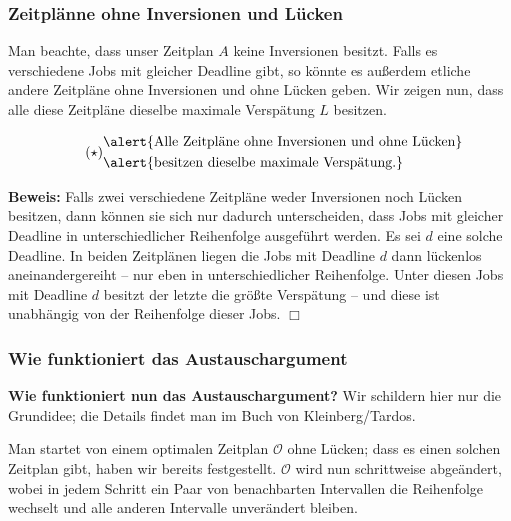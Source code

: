 \documentclass[smaller]{beamer}
\begin{document}
\begin{frame}
 \frametitle{Zeitplänne ohne Inversionen und Lücken}
 Man beachte, dass unser Zeitplan $A$ keine Inversionen besitzt. Falls es verschiedene Jobs mit gleicher Deadline gibt, so könnte es außerdem etliche andere Zeitpläne ohne Inversionen und ohne Lücken geben. Wir zeigen nun, dass alle diese Zeitpläne dieselbe maximale Verspätung $L$ besitzen.

\begin{align}
\label{eq:12:*}
\tag{$\star$}
\begin{split}
&\alert{\text{Alle Zeitpläne ohne Inversionen und ohne Lücken}} \\
&\alert{\text{besitzen dieselbe maximale Verspätung.}}
\end{split}
\end{align}

\textbf{Beweis:} Falls zwei verschiedene Zeitpläne weder Inversionen noch Lücken besitzen, dann können sie sich nur dadurch unterscheiden, dass Jobs mit gleicher Deadline in unterschiedlicher Reihenfolge ausgeführt werden. Es sei $d$ eine solche Deadline. In beiden Zeitplänen liegen die Jobs mit Deadline $d$ dann lückenlos aneinandergereiht -- nur eben in unterschiedlicher Reihenfolge. Unter diesen Jobs mit Deadline $d$ besitzt der letzte die größte Verspätung -- und diese ist unabhängig von der Reihenfolge dieser Jobs. \qquad $\Box$
\end{frame}

\begin{frame}
 \frametitle{Wie funktioniert das Austauschargument}
 \textbf{Wie funktioniert nun das Austauschargument?} Wir schildern hier nur die \alert{Grundidee}; die Details findet man im Buch von Kleinberg/Tardos. \\ \vspace*{0.2cm}
 
 Man startet von einem optimalen Zeitplan $\mathcal{O}$ ohne Lücken; dass es einen solchen Zeitplan gibt, haben wir bereits festgestellt. $\mathcal{O}$ wird nun schrittweise abgeändert, \alert{wobei in jedem Schritt ein Paar von benachbarten Intervallen die Reihenfolge wechselt und alle anderen Intervalle unverändert bleiben}. 
\end{frame}
\end{document}
